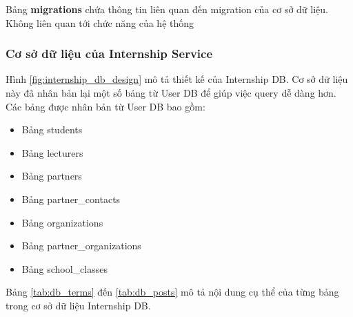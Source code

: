\documentclass[./../main.tex]{subfiles}
\begin{document}
Bảng \textbf{migrations} chứa thông tin liên quan đến migration của cơ sở dữ liệu. Không liên quan tới chức năng của hệ thống

\subsubsection{Cơ sở dữ liệu của Internship Service}

Hình \ref{fig:internship_db_design} mô tả thiết kế của Internship DB. Cơ sở dữ liệu này đã nhân bản lại một số bảng từ User DB để giúp việc query dễ dàng hơn. Các bảng được nhân bản từ User DB bao gồm:

\begin{itemize}
	\item

	      Bảng students

	\item

	      Bảng lecturers

	\item

	      Bảng partners

	\item

	      Bảng partner\_contacts

	\item

	      Bảng organizations

	\item

	      Bảng partner\_organizations

	\item

	      Bảng school\_classes

\end{itemize}

Bảng \ref{tab:db_terms} đến \ref{tab:db_posts} mô tả nội dung cụ thể của từng bảng trong cơ sở dữ liệu Internship DB.
\end{document}
